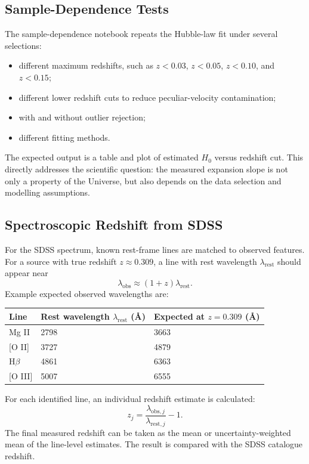 \documentclass[11pt,a4paper]{article}
\begin{document}
\subsection{Sample-Dependence Tests}

The sample-dependence notebook repeats the Hubble-law fit under several selections:
\begin{itemize}
    \item different maximum redshifts, such as $z < 0.03$, $z < 0.05$, $z < 0.10$, and $z < 0.15$;
    \item different lower redshift cuts to reduce peculiar-velocity contamination;
    \item with and without outlier rejection;
    \item different fitting methods.
\end{itemize}

The expected output is a table and plot of estimated $H_0$ versus redshift cut. This directly addresses the scientific question: the measured expansion slope is not only a property of the Universe, but also depends on the data selection and modelling assumptions.

\subsection{Spectroscopic Redshift from SDSS}

For the SDSS spectrum, known rest-frame lines are matched to observed features. For a source with true redshift $z \approx 0.309$, a line with rest wavelength $\lambda_{\mathrm{rest}}$ should appear near
\begin{equation}
    \lambda_{\mathrm{obs}} \approx (1+z)\lambda_{\mathrm{rest}}.
\end{equation}
Example expected observed wavelengths are:

\begin{center}
\begin{tabular}{lll}
\toprule
Line & Rest wavelength $\lambda_{\mathrm{rest}}$ (\AA) & Expected at $z=0.309$ (\AA) \\
\midrule
Mg II & 2798 & 3663 \\
{[O II]} & 3727 & 4879 \\
H$\beta$ & 4861 & 6363 \\
{[O III]} & 5007 & 6555 \\
\bottomrule
\end{tabular}
\end{center}

For each identified line, an individual redshift estimate is calculated:
\begin{equation}
    z_j = \frac{\lambda_{\mathrm{obs},j}}{\lambda_{\mathrm{rest},j}} - 1.
\end{equation}
The final measured redshift can be taken as the mean or uncertainty-weighted mean of the line-level estimates. The result is compared with the SDSS catalogue redshift.
\end{document}
